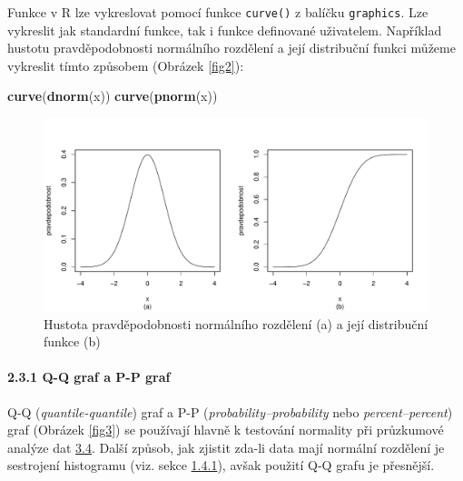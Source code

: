 \documentclass[12pt,]{article}
\newenvironment{Shaded}{\begin{snugshade}}{\end{snugshade}}
\newcommand{\KeywordTok}[1]{\textcolor[rgb]{0.13,0.29,0.53}{\textbf{#1}}}
\newcommand{\NormalTok}[1]{#1}
\let\oldparagraph\paragraph
\renewcommand{\paragraph}[1]{\oldparagraph{#1}\mbox{}}
\begin{document}
Funkce v R lze vykreslovat pomocí funkce \texttt{curve()} z balíčku
\texttt{graphics}. Lze vykreslit jak standardní funkce, tak i funkce
definované uživatelem. Například hustotu pravděpodobnosti normálního
rozdělení a její distribuční funkci můžeme vykreslit tímto způsobem
(Obrázek \ref{fig2}):

\begin{Shaded}
\begin{Highlighting}[]
\KeywordTok{curve}\NormalTok{(}\KeywordTok{dnorm}\NormalTok{(x))}
\KeywordTok{curve}\NormalTok{(}\KeywordTok{pnorm}\NormalTok{(x))}
\end{Highlighting}
\end{Shaded}

\begin{figure}[H]

{\centering \includegraphics{BP_files/figure-latex/normal-1} 

}

\caption{\label{fig2} Hustota pravděpodobnosti normálního rozdělení (a) a její distribuční funkce (b)}\label{fig:normal}
\end{figure}

\newpage

\hypertarget{qqpp}{\paragraph{2.3.1 Q-Q graf a P-P graf}\label{qqpp}}

\qquad Q-Q (\emph{quantile-quantile}) graf a P-P
(\emph{probability--probability} nebo \emph{percent--percent}) graf
(Obrázek \ref{fig3}) se používají hlavně k testování normality při
průzkumové analýze dat \protect\hyperlink{normtests}{3.4}. Další způsob,
jak zjistit zda-li data mají normální rozdělení je sestrojení histogramu
(viz. sekce \protect\hyperlink{hist}{1.4.1}), avšak použití Q-Q grafu je
přesnější.
\end{document}
